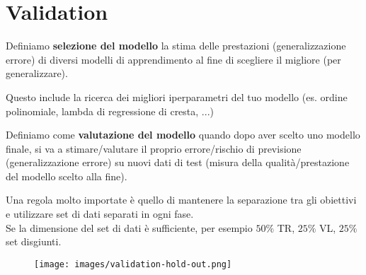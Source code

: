 \newpage
\section{Validation}
\begin{definition}
    Definiamo \textbf{selezione del modello} la stima delle prestazioni (generalizzazione errore) di diversi modelli 
    di apprendimento al fine di scegliere il migliore (per generalizzare).
\end{definition}
\hspace{-15pt}Questo include la ricerca dei migliori iperparametri del tuo modello (es. ordine polinomiale, lambda di regressione di cresta, ...)
\begin{definition}
    Definiamo come \textbf{valutazione del modello} quando dopo aver scelto uno modello finale, si va a stimare/valutare il proprio
    errore/rischio di previsione (generalizzazione errore) su nuovi dati di test (misura della qualità/prestazione del modello scelto alla fine).
\end{definition}
\hspace{-15pt}Una regola molto importate è quello di mantenere la separazione tra gli obiettivi e utilizzare set di dati separati in ogni fase.\\
Se la dimensione del set di dati è sufficiente, per esempio $50\%$ TR, $25\%$ VL, $25\%$ set disgiunti.
\begin{figure}[h!]
    \centering
    \texttt{[image: images/validation-hold-out.png]}
\end{figure}
\vspace{-15pt}
